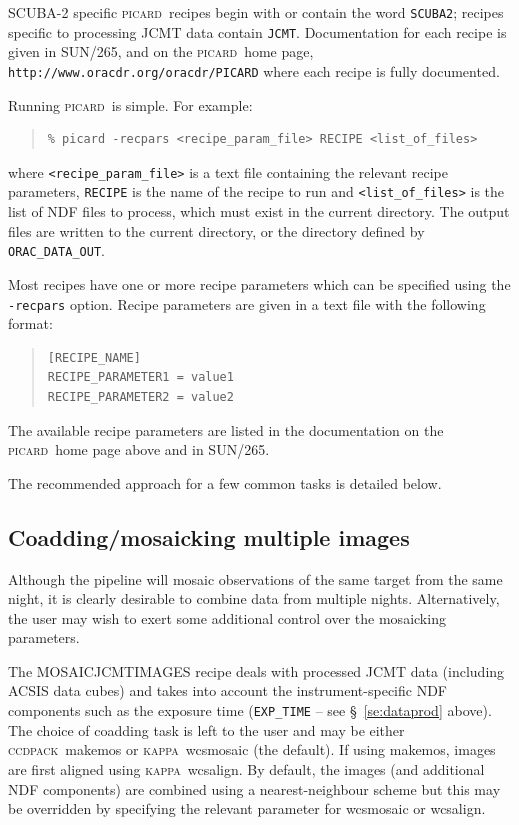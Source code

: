 \documentclass[twoside,11pt]{article}
\newcommand{\htmladdnormallink}[2]{#1}
\newcommand{\xref}[3]{#1}
\renewcommand{\_}{\texttt{\symbol{95}}}
\newenvironment{myquote}{\begin{quote}\begin{small}}{\end{small}\end{quote}}
\newcommand{\CCDPACK}{\textsc{ccdpack}}
\newcommand{\KAPPA}{\textsc{kappa}}
\newcommand{\picard}{\textsc{picard}}
\newcommand{\picardsun}{\xref{SUN/265}{sun265}{}}
\newcommand{\task}[1]{\textsf{#1}}
\begin{document}
SCUBA-2 specific \picard\ recipes begin with or contain the word
\verb+SCUBA2+; recipes specific to processing JCMT data contain
\verb+JCMT+. Documentation for each recipe is given in \picardsun, and
on the \picard\ home page,
\htmladdnormallink{\texttt{http://www.oracdr.org/oracdr/PICARD}}{http://www.oracdr.org/oracdr/PICARD}
where each recipe is fully documented.

Running \picard\ is simple. For example:
\begin{myquote}
\begin{verbatim}
% picard -recpars <recipe_param_file> RECIPE <list_of_files>
\end{verbatim}
\end{myquote}
where \verb+<recipe_param_file>+ is a text file containing the
relevant recipe parameters, \verb+RECIPE+ is the name of the
recipe to run and \verb+<list_of_files>+ is the list of NDF files to
process, which must exist in the current directory. The output files
are written to the current directory, or the directory defined by
\verb+ORAC_DATA_OUT+.

Most recipes have one or more recipe parameters which can be specified
using the \texttt{-recpars} option. Recipe parameters are given in a
text file with the following format:
\begin{myquote}
\begin{verbatim}
[RECIPE_NAME]
RECIPE_PARAMETER1 = value1
RECIPE_PARAMETER2 = value2
\end{verbatim}
\end{myquote}
The available recipe parameters are listed in the documentation on the
\picard\ home page above and in \picardsun.

The recommended approach for a few common tasks is detailed below.

\subsection{Coadding/mosaicking multiple images}

Although the pipeline will mosaic observations of the same target from
the same night, it is clearly desirable to combine data from multiple
nights. Alternatively, the user may wish to exert some additional
control over the mosaicking parameters.

The \task{MOSAIC\_JCMT\_IMAGES} recipe deals with processed JCMT data
(including ACSIS data cubes) and takes into account the
instrument-specific NDF components such as the exposure time
(\verb+EXP_TIME+ -- see \S\ \ref{se:dataprod} above). The choice of
coadding task is left to the user and may be either
\CCDPACK\ \task{makemos} or \KAPPA\ \task{wcsmosaic} (the default). If
using \task{makemos}, images are first aligned using
\KAPPA\ \task{wcsalign}. By default, the images (and additional NDF
components) are combined using a nearest-neighbour scheme but this may
be overridden by specifying the relevant parameter for
\task{wcsmosaic} or \task{wcsalign}.
\end{document}
